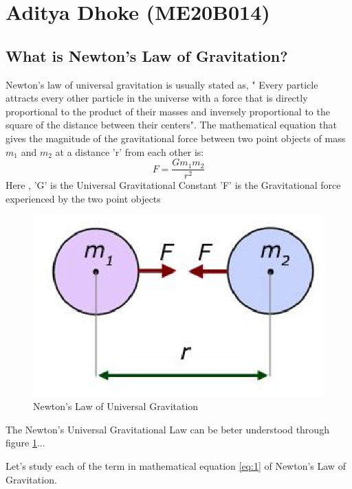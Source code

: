 \section{Aditya Dhoke (ME20B014)}
\vspace{0.25cm}
\subsection{What is Newton's Law of Gravitation?}  
Newton's law of universal gravitation is usually stated as, " Every particle attracts every other particle in the universe with a force that is directly proportional to the product of their masses and inversely proportional to the square of the distance between their centers".
   The mathematical equation that gives the magnitude of the gravitational force between two point objects of mass  $ m_1 $ and $ m_2 $ at a distance 'r' from each other is:
   \begin{equation} \label{eq:1}
         F = \frac{Gm_1m_2}{r^2}
   \end{equation}
   Here , 'G' is the Universal Gravitational Constant 
          'F' is the Gravitational force experienced by the two point objects \par
          \begin{figure}[h]
          \begin{center}
          \includegraphics[scale=1]{me20b014/me20b014.eps} 
          \end{center}
          \caption{Newton's Law of Universal Gravitation}
          \label{fig1}
          \end{figure}
The Newton's Universal Gravitational Law can be beter understood through figure \ref{fig1}... \par
 Let's study each of the term in mathematical equation \ref{eq:1} of Newton's Law of Gravitation.
